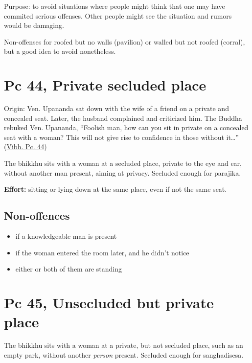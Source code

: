 Purpose: to avoid situations where people might think that one may have
commited serious offenses. Other people might see the situation and
rumors would be damaging.

Non-offenses for roofed but no walls (pavilion) or walled but not roofed
(corral), but a good idea to avoid nonetheless.

\section{Pc 44, Private secluded place}

Origin: Ven. Upananda sat down with the wife of a friend on a private
and concealed seat. Later, the husband complained and criticized him.
The Buddha rebuked Ven. Upananda, ``Foolish man, how can you sit in
private on a concealed seat with a woman? This will not give rise to
confidence in those without it\ldots{}''
(\href{https://suttacentral.net/pli-tv-bu-vb-pc44/en/brahmali}{Vibh. Pc.
44})

The bhikkhu sits with a woman at a secluded place, private to the eye
and ear, without another man present, aiming at privacy. Secluded enough
for parajika.

\textbf{Effort:} sitting or lying down at the same place, even if not
the same seat.

\subsection{Non-offences}

\vspace*{-0.5\baselineskip}
\enlargethispage{\baselineskip}

\begin{itemize}
\tightlist
\item
  if a knowledgeable man is present
\item
  if the woman entered the room later, and he didn't notice
\item
  either or both of them are standing
\end{itemize}

\section{Pc 45, Unsecluded but private place}

The bhikkhu sits with a woman at a private, but not secluded place, such
as an empty park, without another \emph{person} present. Secluded enough
for sanghadisesa.

